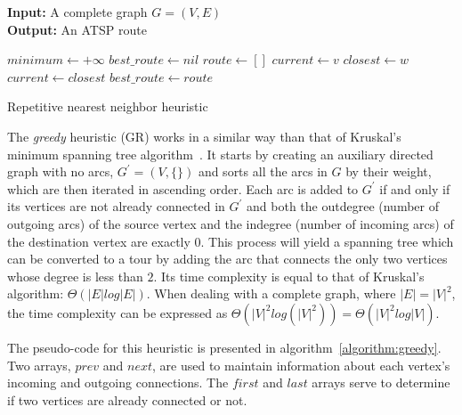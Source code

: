 \begin{algorithm}
  \textbf{Input:} A complete graph $G=(V,E)$ \\
  \textbf{Output:} An ATSP route
  \begin{algorithmic}[1]
    \STATE $minimum \gets +\infty$
    \STATE $best\_route \gets nil$
      \STATE $route \gets []$
      \STATE $current \gets v$
            \STATE $closest \gets w$
          \ENDIF
        \ENDFOR
        \STATE $current \gets closest$
      \ENDWHILE
        \STATE $best\_route \gets route$
      \ENDIF
    \ENDFOR
  \end{algorithmic}
  \caption{Repetitive nearest neighbor heuristic}
  \label{algorithm:rnn}
\end{algorithm}

The \textit{greedy} heuristic (GR) works in a similar way than that of Kruskal's
minimum spanning tree algorithm~\citep{Kruskal1956}. It starts by creating an
auxiliary directed graph with no arcs, $G^\prime = (V, \{\})$ and sorts all the
arcs in $G$ by their weight, which are then iterated in ascending order. Each
arc is added to $G^\prime$ if and only if its vertices are not already connected
in $G^\prime$ and both the outdegree (number of outgoing arcs) of the source
vertex and the indegree (number of incoming arcs) of the destination vertex are
exactly $0$. This process will yield a spanning tree which can be converted to a
tour by adding the arc that connects the only two vertices whose degree is less
than $2$. Its time complexity is equal to that of Kruskal's algorithm:
$\Theta(|E| log |E|)$. When dealing with a complete graph, where $|E| = |V|^2$,
the time complexity can be expressed as $\Theta(|V|^2 log(|V|^2)) = \Theta(|V|^2
log |V|)$.

The pseudo-code for this heuristic is presented in
algorithm~\ref{algorithm:greedy}. Two arrays, $prev$ and $next$, are used to
maintain information about each vertex's incoming and outgoing connections. The
$first$ and $last$ arrays serve to determine if two vertices are already
connected or not.

\newpage


